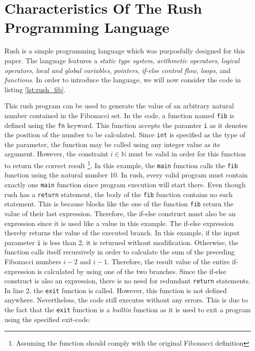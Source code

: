 \newpage
\section{Characteristics Of The Rush Programming Language}

Rush is a simple programming language which was purposfully designed for this paper.
The language features a \emph{static type system}, \emph{arithmetic operators}, \emph{logical operators}, \emph{local and global variables}, \emph{pointers}, \emph{if-else control flow}, \emph{loops}, and \emph{functions}.
In order to introduce the language, we will now consider the code in listing \ref{lst:rush_fib}.


This rush program can be used to generate the value of an arbitrary natural number contained in the Fibonacci set.
In the code, a function named \texttt{fib} is defined using the \texttt{fn} keyword.
This function accepts the paramter \texttt{i} as it denotes the position of the number to be calculated.
Since \texttt{int} is specified as the type of the parameter, the function may be called using any integer value as its argument.
However, the constraint $i \in \mathbb{N}$ must be valid in order for this function to return the correct result \footnote{Assuming the function should comply with the original Fibonacci definition}.
In this example, the \texttt{main} function calls the \texttt{fib} function using the natural number 10.
In rush, every valid program must contain exactly one \texttt{main} function since program execution will start there.
Even though rush has a \texttt{return} statement, the body of the \texttt{fib} function contains no such statement.
This is because blocks like the one of the function \texttt{fib} return the value of their last expression.
Therefore, the if-else construct must also be an expression since it is used like a value in this example.
The if-else expression thereby returns the value of the executed branch.
In this example, if the input parameter \texttt{i} is less than 2, it is returned without modification.
Otherwise, the function calls itself recursively in order to calculate the sum of the preceding Fibonacci numbers $i - 2$ and $i - 1$.
Therefore, the result value of the entire if-expression is calculated by using one of the two branches.
Since the if-else construct is also an expression, there is no need for redundant \texttt{return} statements.
In line 2, the \texttt{exit} function is called.
However, this function is not defined anywhere.
Nevertheless, the code still executes without any errors.
This is due to the fact that the \texttt{exit} function is a \emph{builtin} function as it is used to exit a program using the specified exit-code.

